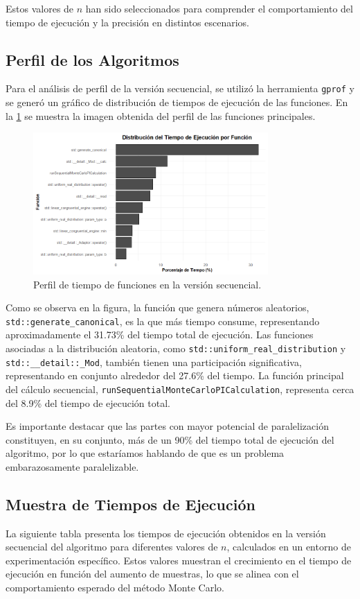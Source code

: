 \documentclass[a4paper, 10pt, onecolumn]{IEEEtran}
\begin{document}
Estos valores de $n$ han sido seleccionados para comprender el comportamiento del tiempo de ejecución y la precisión en distintos escenarios.

\subsection{Perfil de los Algoritmos}
Para el análisis de perfil de la versión secuencial, se utilizó la herramienta \texttt{gprof} y se generó un gráfico de distribución de tiempos de ejecución de las funciones. En la \cref{fig:sec_profile} se muestra la imagen obtenida del perfil de las funciones principales.

\begin{figure}[H]
  \centering
  \includegraphics[width=0.8\textwidth]{./img/secuencial_profiling.png}
  \caption{Perfil de tiempo de funciones en la versión secuencial.}
  \label{fig:sec_profile}
\end{figure}

Como se observa en la figura, la función que genera números aleatorios, \texttt{std::generate\_canonical}, es la que más tiempo consume, representando aproximadamente el 31.73\% del tiempo total de ejecución. Las funciones asociadas a la distribución aleatoria, como \texttt{std::uniform\_real\_distribution} y \texttt{std::\_\_detail::\_Mod}, también tienen una participación significativa, representando en conjunto alrededor del 27.6\% del tiempo. La función principal del cálculo secuencial, \texttt{runSequentialMonteCarloPICalculation}, representa cerca del 8.9\% del tiempo de ejecución total.

Es importante destacar que las partes con mayor potencial de paralelización constituyen, en su conjunto, más de un 90\% del tiempo total de ejecución del algoritmo, por lo que estaríamos hablando de que es un problema embarazosamente paralelizable.

\subsection{Muestra de Tiempos de Ejecución}
La siguiente tabla presenta los tiempos de ejecución obtenidos en la versión secuencial del algoritmo para diferentes valores de $n$, calculados en un entorno de experimentación específico. Estos valores muestran el crecimiento en el tiempo de ejecución en función del aumento de muestras, lo que se alinea con el comportamiento esperado del método Monte Carlo.
\end{document}
